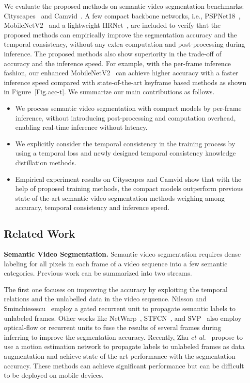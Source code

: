 \documentclass[runningheads]{llncs}
\newcommand{\etal}{\textit{et al.}}
\begin{document}
We evaluate the proposed methods on semantic video segmentation benchmarks: Cityscapes~\cite{Cordts2016Cityscapes} and Camvid~\cite{brostow2008segmentation}. 
A few
compact backbone networks, i.e., PSPNet18~\cite{zhao2017pyramid}, MobileNetV2~\cite{Sandler2018MobileNetV2IR} and a lightweight HRNet~\cite{SunZJCXLMWLW19}, are included to verify that the proposed methods can empirically improve the segmentation accuracy and the temporal consistency, without any extra computation and post-processing during inference. The proposed methods also show superiority in the trade-off of accuracy and the inference speed.  For example, with the per-frame inference fashion, our enhanced MobileNetV2~\cite{Sandler2018MobileNetV2IR} can achieve higher accuracy with a faster inference speed compared with state-of-the-art keyframe based methods as shown in Figure~\ref{Fig.acc-t}.
We summarize our main contributions as follows.
\begin{itemize}
    \setlength{\itemsep}{0pt}
    \setlength{\parskip}{0pt}
    \setlength{\parsep}{0pt}
    \item We process semantic video segmentation with compact models by per-frame inference, without introducing  post-processing and computation overhead, 
    enabling  real-time inference  without latency.
    \item We explicitly consider the temporal consistency in the training process by using a temporal loss and 
    newly 
    designed temporal consistency knowledge distillation methods.
    \item Empirical experiment results on Cityscapes and Camvid show that with the help of proposed training methods, the compact models outperform previous state-of-the-art semantic video segmentation methods weighing among accuracy, temporal consistency and inference speed. 
\end{itemize}
 


\subsection{Related Work}
\noindent\textbf{Semantic Video Segmentation.} Semantic video segmentation requires dense labeling for all pixels in each frame of a video sequence into a few semantic categories.
Previous work can be summarized into two streams.

The first one focuses on improving the accuracy by exploiting the temporal relations and the unlabelled data in the video sequence. Nilsson and Sminchiesescu~\cite{nilsson2018semantic} employ a gated recurrent unit to propagate semantic labels to unlabeled frames. Other works like NetWarp~\cite{gadde2017semantic}, STFCN~\cite{fayyaz2016stfcn}, and SVP~\cite{liu2017surveillance} also employ optical-flow or recurrent units to fuse the results of several frames during inferring to improve the segmentation accuracy. Recently, Zhu \etal ~\cite{zhu2019improving} propose to use a motion estimation network to propagate
labels to unlabeled frames as data augmentation and achieve state-of-the-art performance with the segmentation accuracy. These methods can achieve significant performance but
can be difficult to be deployed
on mobile devices.
\end{document}
